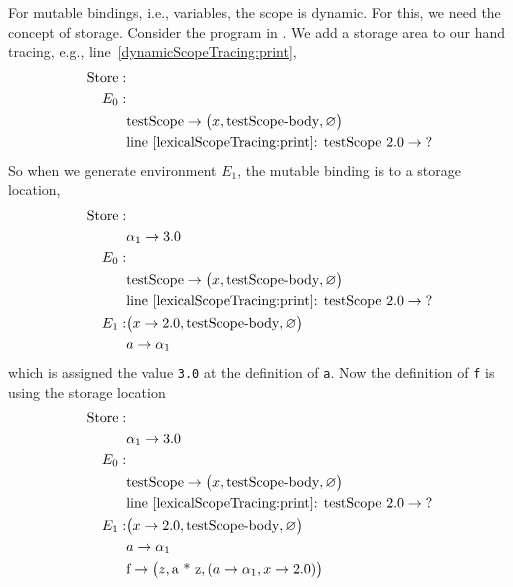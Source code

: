 For mutable bindings, i.e., variables, the scope is dynamic. For this, we need the concept of storage. Consider the program in .
%
%
We add a storage area to our hand tracing, e.g., line~\ref{dynamicScopeTracing:print},
\begin{align*}
  \text{Store}: &\\
  E_0:&\\
      &\text{testScope} \rightarrow \big(x, \text{testScope-body}, \varnothing\big)\\
      & \text{line~\ref{lexicalScopeTracing:print}: testScope 2.0} \rightarrow \text{?}\\
\end{align*}
So when we generate environment $E_1$, the mutable binding is to a storage location,
\begin{align*}
  \text{Store}: &\\
  & \alpha_1 \rightarrow 3.0\\
  E_0:&\\
      &\text{testScope} \rightarrow \big(x, \text{testScope-body}, \varnothing\big)\\
      & \text{line~\ref{lexicalScopeTracing:print}: testScope 2.0} \rightarrow \text{?}\\
  E_1: & \big(x\rightarrow 2.0, \text{testScope-body}, \varnothing\big)\\
      & a \rightarrow \alpha_1\\
\end{align*}
which is assigned the value \lstinline!3.0! at the definition of \lstinline!a!. Now the definition of \lstinline!f! is using the storage location
\begin{align*}
  \text{Store}: &\\
  & \alpha_1 \rightarrow 3.0\\
  E_0:&\\
      &\text{testScope} \rightarrow \big(x, \text{testScope-body}, \varnothing\big)\\
      & \text{line~\ref{lexicalScopeTracing:print}: testScope 2.0} \rightarrow \text{?}\\
  E_1: & \big(x\rightarrow 2.0, \text{testScope-body}, \varnothing\big)\\
      & a \rightarrow \alpha_1\\
      & \text{f} \rightarrow \big(z, \text{a * z}, (a \rightarrow \alpha_1, x\rightarrow 2.0)\big)\\
\end{align*}
